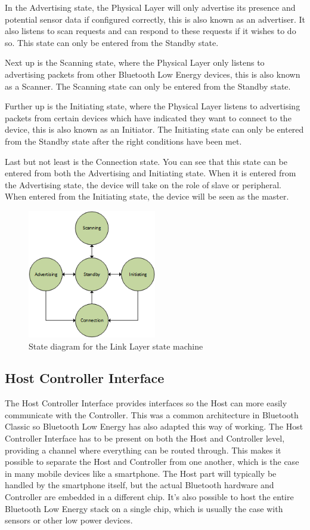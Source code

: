 \documentclass[pdftex,a4paper,12pt,twoside]{report}
\begin{document}
In the Advertising state, the Physical Layer will only advertise its presence and potential sensor data if configured correctly, this is also known as an advertiser. It also listens to scan requests and can respond to these requests if it wishes to do so. This state can only be entered from the Standby state.

Next up is the Scanning state, where the Physical Layer only listens to advertising packets from other Bluetooth Low Energy devices, this is also known as a Scanner. The Scanning state can only be entered from the Standby state.

Further up is the Initiating state, where the Physical Layer listens to advertising packets from certain devices which have indicated they want to connect to the device, this is also known as an Initiator. The Initiating state can only be entered from the Standby state after the right conditions have been met.

Last but not least is the Connection state. You can see that this state can be entered from both the Advertising and Initiating state. When it is entered from the Advertising state, the device will take on the role of slave or peripheral. When entered from the Initiating state, the device will be seen as the master.

\begin{figure}[h]
    \centering
    \includegraphics[width=0.5\textwidth]{img/llstate.png}
    \caption{State diagram for the Link Layer state machine}
    \label{fig:llstatemachine}
\end{figure}

\subsection{Host Controller Interface}
\label{subsec:controllerHCI}
The Host Controller Interface provides interfaces so the Host can more easily communicate with the Controller. This was a common architecture in Bluetooth Classic so Bluetooth Low Energy has also adapted this way of working. The Host Controller Interface has to be present on both the Host and Controller level, providing a channel where everything can be routed through. This makes it possible to separate the Host and Controller from one another, which is the case in many mobile devices like a smartphone. The Host part will typically be handled by the smartphone itself, but the actual Bluetooth hardware and Controller are embedded in a different chip. It's also possible to host the entire Bluetooth Low Energy stack on a single chip, which is usually the case with sensors or other low power devices.
\end{document}
